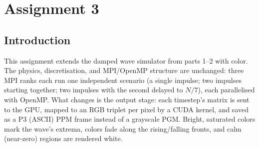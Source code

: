 
\section{Assignment 3}

\subsection{Introduction}
This assignment extends the damped wave simulator from parts 1--2 with
color. The physics, discretisation, and MPI/OpenMP structure are
unchanged: three MPI ranks each run one independent scenario (a single
impulse; two impulses starting together; two impulses with the second
delayed to $N/7$), each parallelised with OpenMP. What changes is the
output stage: each timestep's matrix is sent to the GPU, mapped to an RGB
triplet per pixel by a CUDA kernel, and saved as a P3 (ASCII) PPM frame
instead of a grayscale PGM. Bright, saturated colors mark the wave's
extrema, colors fade along the rising/falling fronts, and calm (near-zero)
regions are rendered white. 

